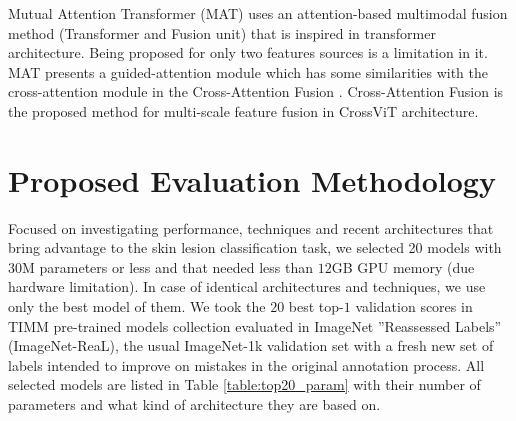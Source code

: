 \documentclass[conference]{IEEEtran}
\begin{document}
Mutual Attention Transformer (MAT) \cite{Zhou2021FusionMAT} uses an attention-based multimodal fusion method (Transformer and Fusion unit) that is inspired in transformer architecture. Being proposed for only two features sources is a limitation in it. MAT presents a guided-attention module which has some similarities with the cross-attention module in the Cross-Attention Fusion \cite{chen2021crossvit}. Cross-Attention Fusion is the proposed method for multi-scale feature fusion in CrossViT architecture.

\section{Proposed Evaluation Methodology}

Focused on investigating performance, techniques and recent architectures that bring advantage to the skin lesion classification task, we selected 20 models with $30$M parameters or less and that needed less than $12$GB GPU memory (due hardware limitation). In case of identical architectures and techniques, we use only the best model of them. We took the $20$ best top-$1$ validation scores in TIMM pre-trained models collection\cite{rw2019timm} evaluated in ImageNet ''Reassessed Labels'' (ImageNet-ReaL)\cite{beyer2020imagenetreal}, the usual ImageNet-1k validation set with a fresh new set of labels intended to improve on mistakes in the original annotation process. All selected models are listed in Table \ref{table:top20_param} with their number of parameters and what kind of architecture they are based on.
\end{document}
